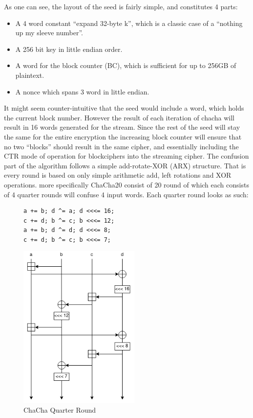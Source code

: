 \documentclass[a4paper]{article}
\begin{document}
As one can see, the layout of the seed is fairly simple, and constitutes 4 parts:
\begin{itemize}
\item A 4 word constant ``expand 32-byte k'', which is a classic case of a ``nothing up my sleeve number''.
\item A 256 bit key in little endian order.
\item A word for the block counter (BC), which is sufficient for up to 256GB of plaintext.
\item A nonce which spans 3 word in little endian.
\end{itemize}
It might seem counter-intuitive that the seed would include a word, which holds the current block number. However the result of each iteration of chacha will result in 16 words generated for the stream. Since the rest of the seed will stay the same for the entire encryption the increasing block counter will ensure that no two ``blocks'' should result in the same cipher, and essentially including the CTR mode of operation for blockciphers into the streaming cipher. The confusion part of the algorithm follows a simple add-rotate-XOR (ARX) structure. That is every round is based on only simple arithmetic add, left rotations and XOR operations. more specifically ChaCha20 consist of 20 round of which each consists of 4 quarter rounds will confuse 4 input words. Each quarter round looks as such:
\begin{figure}[!htb]
\begin{minipage}{0.4\textwidth}
\begin{verbatim}
a += b; d ^= a; d <<<= 16;
c += d; b ^= c; b <<<= 12;
a += b; d ^= d; d <<<= 8;
c += d; b ^= c; b <<<= 7;
\end{verbatim}
\end{minipage}
\qquad
\begin{minipage}{0.4\textwidth}
\includegraphics[width=6cm]{Background/ChaChaQR.png}
\end{minipage}
\caption{ChaCha Quarter Round}
\label{fig:ChaChaQR}
\end{figure}
\end{document}
